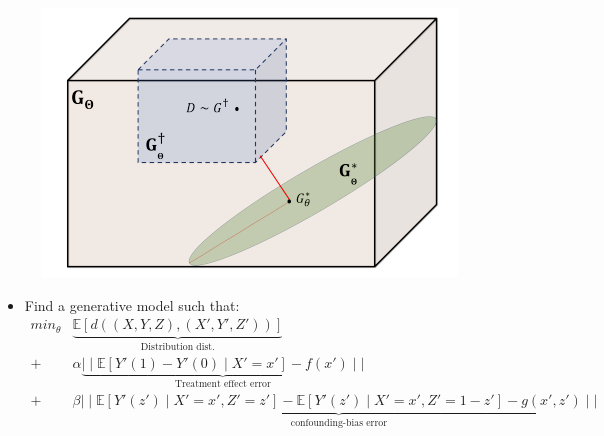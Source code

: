 \documentclass{beamer}
\begin{document}
\begin{frame}
	\frametitle{}
	\begin{figure}
		\centering
		\includegraphics[scale=0.45]{imgs/distributions.png}
	\end{figure}
	\begin{itemize}
		\item Find a generative model such that:		
		\begin{equation*}
			\begin{split}
				min_{\theta} & \underbrace{\mathbb{E}[d((X, Y, Z), (X', Y', Z'))]}_{\text{Distribution dist.}} \\
				+ & \alpha \underbrace{\mid\mid \mathbb{E}[Y'(1) - Y'(0) \mid X'=x'] - f(x') \mid \mid}_{\text{Treatment effect error}}  \\
				+ & \beta \underbrace{\mid \mid \mathbb{E}[Y'(z') \mid X'=x', Z'=z'] - \mathbb{E}[Y'(z') \mid X'=x', Z'=1-z'] - g(x', z') \mid \mid}_{\text{confounding-bias error}} \\
			\end{split}
		\end{equation*}
	\end{itemize}
\end{frame}
\end{document}
